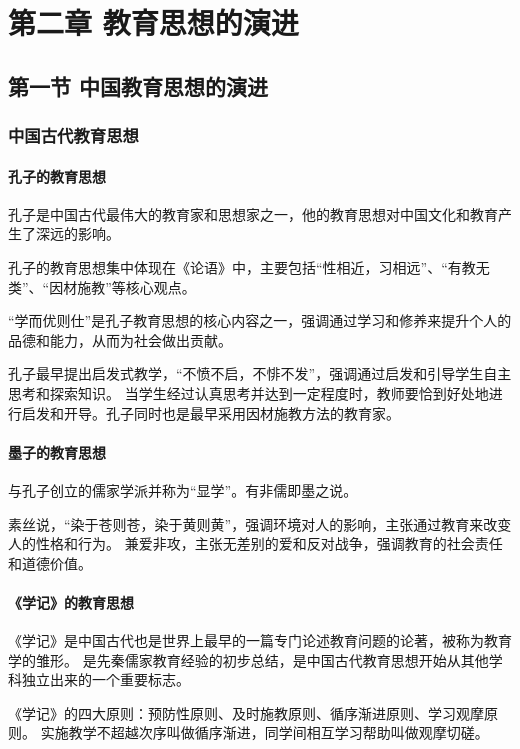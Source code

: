 \documentclass[b5paper,11pt]{article}
\begin{document}
\section{第二章 教育思想的演进}
\subsection{第一节 中国教育思想的演进}

\subsubsection{中国古代教育思想}
\paragraph{孔子的教育思想} 孔子是中国古代最伟大的教育家和思想家之一，他的教育思想对中国文化和教育产生了深远的影响。

\textcolor{ctp-red}{孔子的教育思想集中体现在《论语》中，主要包括“性相近，习相远”、“有教无类”、“因材施教”等核心观点。}

“学而优则仕”是孔子教育思想的核心内容之一，强调通过学习和修养来提升个人的品德和能力，从而为社会做出贡献。

孔子最早提出\textcolor{ctp-peach}{启发式教学}，“不愤不启，不悱不发”，强调通过启发和引导学生自主思考和探索知识。
\textcolor{ctp-red}{当学生经过认真思考并达到一定程度时，教师要恰到好处地进行启发和开导。}孔子同时也是最早采用因材施教方法的教育家。

\paragraph{墨子的教育思想} 与孔子创立的儒家学派并称为\textcolor{ctp-red}{“显学”}。有非儒即墨之说。

\textcolor{ctp-red}{素丝说}，“染于苍则苍，染于黄则黄”，强调环境对人的影响，主张通过教育来改变人的性格和行为。
\textcolor{ctp-red}{兼爱非攻}，主张无差别的爱和反对战争，强调教育的社会责任和道德价值。

\paragraph{《学记》的教育思想}
\textcolor{ctp-red}{《学记》}是中国古代也是世界上最早的一篇专门论述教育问题的论著，被称为\textcolor{ctp-red}{教育学的雏形}。
是先秦儒家教育经验的初步总结，\textcolor{ctp-red}{是中国古代教育思想开始从其他学科独立出来的一个重要标志}。

《学记》的\textcolor{ctp-red}{四大原则}：\textcolor{ctp-red}{预防性原则、及时施教原则、循序渐进原则、学习观摩原则}。
实施教学不超越次序叫做循序渐进，同学间相互学习帮助叫做观摩切磋。
\end{document}
